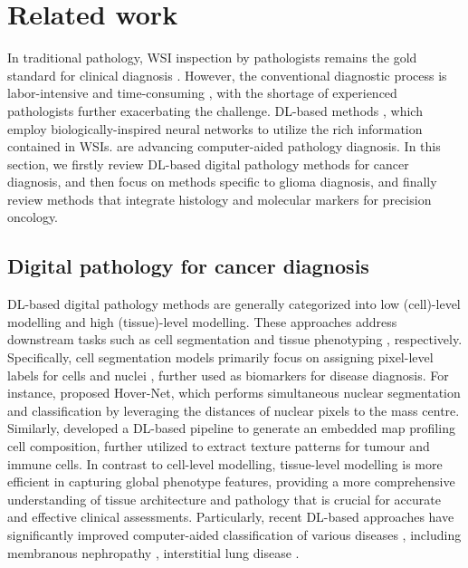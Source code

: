 \section{Related work}
In traditional pathology,  WSI inspection by pathologists remains the gold standard for clinical diagnosis \citep{deng2020deep}. However, the conventional diagnostic process is labor-intensive and time-consuming \citep{deng2020deep}, with the shortage of experienced pathologists further exacerbating the challenge. DL-based methods \citep{martinez2023computer}, which employ biologically-inspired neural networks to utilize the rich information contained in WSIs. are advancing computer-aided pathology diagnosis. In this section, we firstly review DL-based digital pathology methods for cancer diagnosis, and then focus on  methods specific to glioma diagnosis, and finally review methods that integrate histology and molecular markers for precision oncology.


\subsection{Digital pathology for cancer diagnosis}



DL-based digital pathology methods are generally  categorized into low (cell)-level modelling and high (tissue)-level modelling. These approaches address downstream tasks such as cell segmentation \citep{graham2019hover} and tissue phenotyping  \citep{bhattacharyya2024efficient}, respectively. Specifically, cell segmentation models primarily focus on assigning pixel-level labels for cells and nuclei \citep{graham2019hover}, further used as biomarkers for disease diagnosis. For instance, \cite{graham2019hover} proposed Hover-Net, which performs simultaneous nuclear segmentation and classification by leveraging the distances of nuclear pixels to the mass centre. Similarly, \cite{ren2021deep}  developed a DL-based pipeline to generate an embedded map profiling cell composition,  further utilized to extract texture patterns for tumour and immune cells. 
In contrast to cell-level modelling, tissue-level modelling is more efficient in capturing global phenotype features,  providing a more comprehensive understanding of tissue architecture and pathology that is crucial for accurate and effective clinical assessments. Particularly, recent DL-based approaches  have significantly improved computer-aided classification of various diseases \citep{li2022comprehensive}, including membranous nephropathy \citep{hao2023accurate}, interstitial lung disease \citep{uegami2022mixture}. 


